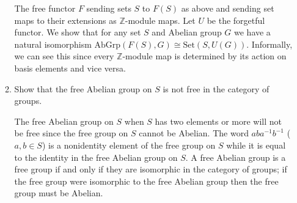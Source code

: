 \documentclass[11pt]{article}
\begin{document}
\begin{enumerate}
\begin{enumerate}[label=(\roman*)]
        The free functor $F$ sending sets $S$ to $F(S)$ as above and sending set maps to their extensions as $\mathbb{Z}$-module maps. Let $U$ be the forgetful functor. We show that for any set $S$ and Abelian group $G$ we have a natural isomorphism $\text{AbGrp}(F(S), G)\cong \text{Set}(S,U(G))$. Informally, we can see this since every $\mathbb{Z}$-module map is determined by its action on basis elements and vice versa.
        \item Show that the free Abelian group on $S$ is not free in the category of groups.
        
        The free Abelian group on $S$ when $S$ has two elements or more will not be free since the free group on $S$ cannot be Abelian. The word $aba^{-1}b^{-1}$ ($a,b\in S$) is a nonidentity element of the free group on $S$ while it is equal to the identity in the free Abelian group on $S$. A free Abelian group is a free group if and only if they are isomorphic in the category of groups; if the free group were isomorphic to the free Abelian group then the free group must be Abelian.
    \end{enumerate} 
\end{enumerate}
\end{document}
